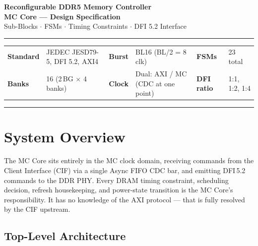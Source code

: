 \documentclass[10pt,a4paper]{article}
\begin{document}

\begin{flushleft}
  {\large\bfseries Reconfigurable DDR5 Memory Controller}\\[2pt]
  {\normalsize\bfseries MC Core --- Design Specification}\\[3pt]
  {\small\color{notetext}
   Sub-Blocks $\cdot$ FSMs $\cdot$ Timing Constraints $\cdot$ DFI 5.2 Interface}
\end{flushleft}
\noindent\color{ruleclr}\rule{\linewidth}{0.6pt}

\smallskip
\begin{tabular}{@{}ll@{\qquad}ll@{\qquad}ll@{}}
\small\textbf{Standard} & \small JEDEC JESD79-5, DFI 5.2, AXI4 &
\small\textbf{Burst} & \small BL16 (BL/2 = 8 clk) &
\small\textbf{FSMs} & \small 23 total \\
\small\textbf{Banks} & \small 16 (2\,BG $\times$ 4 banks) &
\small\textbf{Clock} & \small Dual: AXI / MC (CDC at one point) &
\small\textbf{DFI ratio} & \small 1:1, 1:2, 1:4 \\
\end{tabular}

\vspace{2pt}\noindent\color{ruleclr}\rule{\linewidth}{0.4pt}

\section{System Overview}

The MC Core sits entirely in the MC clock domain, receiving commands from the Client Interface
(CIF) via a single Async FIFO CDC bar, and emitting DFI\,5.2 commands to the DDR PHY.
Every DRAM timing constraint, scheduling decision, refresh housekeeping, and power-state
transition is the MC Core's responsibility. It has no knowledge of the AXI protocol ---
that is fully resolved by the CIF upstream.

\subsection{Top-Level Architecture}
\end{document}
